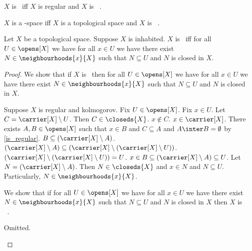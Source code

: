 \begin{abbreviation}\label{teethree}
    $X$ is \teethree\ iff $X$ is regular and $X$ is \teezero\ .
\end{abbreviation}

\begin{abbreviation}\label{teethree_space}
    $X$ is a \teethree-space iff $X$ is a topological space and $X$ is \teethree\ .
\end{abbreviation}

\begin{proposition}\label{eqvilance_teethree_closed_neighbourhood_in_open}
    Let $X$ be a topological space.
    Suppose $X$ is inhabited.
    $X$ is \teethree\ iff for all $U \in \opens[X]$ we have for all $x \in U$ we have there exist $N \in \neighbourhoods{x}{X}$ such that $N \subseteq U$ and $N$ is closed in $X$.    
\end{proposition}
\begin{proof}

    We show that if $X$ is \teethree\ then for all $U \in \opens[X]$ we have for all $x \in U$ we have there exist $N \in \neighbourhoods{x}{X}$ such that $N \subseteq U$ and $N$ is closed in $X$.    
    \begin{subproof}
        Suppose $X$ is regular and kolmogorov.
        Fix $U \in \opens[X]$.
        Fix $x \in U$.
        Let $C = \carrier[X] \setminus U$.
        Then $C \in \closeds{X}$.
        $x \notin C$.
        $x \in \carrier[X]$.
        There exists $A,B \in \opens[X]$ such that $x \in B$ and $C \subseteq A$ and $A \inter B = \emptyset$ by \cref{is_regular}.        
        $B \subseteq (\carrier[X] \setminus A)$.
        $(\carrier[X] \setminus A) \subseteq (\carrier[X] \setminus (\carrier[X] \setminus U))$.
        $(\carrier[X] \setminus (\carrier[X] \setminus U)) = U$.
        $x \in B \subseteq (\carrier[X] \setminus A) \subseteq U$.
        Let $N = (\carrier[X] \setminus A)$.
        Then $N \in \closeds{X}$ and $x \in N$ and $N \subseteq U$.
        Particularly, $N \in \neighbourhoods{x}{X}$.
    \end{subproof}
    We show that if for all $U \in \opens[X]$ we have for all $x \in U$ we have there exist $N \in \neighbourhoods{x}{X}$ such that $N \subseteq U$ and $N$ is closed in $X$ then $X$ is \teethree\ .    
    \begin{subproof}
        Omitted.
    \end{subproof}
\end{proof}




